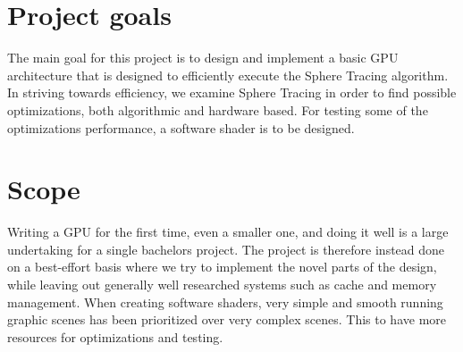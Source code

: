	\section{Project goals}
	
		The main goal for this project is to design and implement a basic GPU
		architecture that is designed to efficiently execute the Sphere Tracing
		algorithm. In striving towards efficiency, we examine Sphere Tracing in
		order to find possible optimizations, both algorithmic and hardware based.
		For testing some of the optimizations performance, a software shader is to
		be designed.
		
	\section{Scope}


		Writing a GPU for the first time, even a smaller one, and doing it well
		is a large undertaking for a single bachelors project. The project is
		therefore instead done on a best-effort basis where we try to implement
		the novel parts of the design, while leaving out generally well
		researched systems such as cache and memory management. When creating 
                software shaders, very simple and smooth running graphic scenes has been 
                prioritized over very complex scenes. This to have more resources for 
                optimizations and testing.



